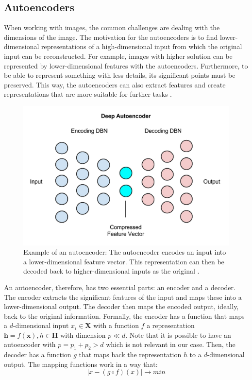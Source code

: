 \subsection{Autoencoders} \label{sec:autoencoders}
When working with images, the common challenges are dealing with the dimensions of the image. The motivation for the autoencoders is to find lower-dimensional representations of a high-dimensional input from which the original input can be reconstructed. For example, images with higher solution can be represented by lower-dimensional features with the autoencoders. Furthermore, to be able to represent something with less details, its significant points must be preserved. This way, the autoencoders can also extract features and create representations that are more suitable for further tasks \cite{autoencoderVisualize}. 

\begin{figure}[tbh]
  \centering
    \includegraphics[width=0.6\linewidth]{abbildungen/autoencoders.png}
  \caption{Example of an autoencoder: The autoencoder encodes an input into a lower-dimensional feature vector. This representation can then be decoded back to higher-dimensional inputs as the original \cite{fig:autoencoders}.}
  \label{fig:autoencoders} 
\end{figure}

An autoencoder, therefore, has two essential parts: an encoder and a decoder. The encoder extracts the significant features of the input and maps these into a lower-dimensional output. The decoder then maps the encoded output, ideally, back to the original information. Formally, the encoder has a function that maps a $d$-dimensional input $x_i \in \bm{X}$ with a function $f$ a representation $\bm{h} = f(\bm{x}), h \in \bm{H}$ with dimension $p \ll d$. Note that it is possible to have an autoencoder with $p = p_1 + p_2 > d$ \cite{autoencoderDeep} which is not relevant in our case. Then, the decoder has a function $g$ that maps back the representation $h$ to a $d$-dimensional output. The mapping functions work in a way that:
 	\begin{equation} \label{eq:autoencoder}
			|x - (g \circ f)(x)| \rightarrow min
	\end{equation}

